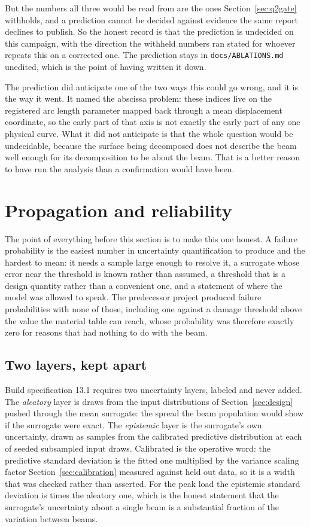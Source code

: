 \documentclass[11pt,a4paper]{article}
\begin{document}
But the numbers all three would be read from are the ones Section~\ref{sec:q2gate} withholds,
and a prediction cannot be decided against evidence the same report declines to publish. So the
honest record is that the prediction is undecided on this campaign, with the direction the
withheld numbers ran stated for whoever repeats this on a corrected one. The prediction stays in
\texttt{docs/ABLATIONS.md} unedited, which is the point of having written it down.

The prediction did anticipate one of the two ways this could go wrong, and it is the way it
went. It named the abscissa problem: these indices live on the registered arc length parameter
mapped back through a mean displacement coordinate, so the early part of that axis is not
exactly the early part of any one physical curve. What it did not anticipate is that the whole
question would be undecidable, because the surface being decomposed does not describe the beam
well enough for its decomposition to be about the beam. That is a better reason to have run the
analysis than a confirmation would have been.

\section{Propagation and reliability}
\label{sec:propagation}
The point of everything before this section is to make this one honest. A failure probability is
the easiest number in uncertainty quantification to produce and the hardest to mean: it needs a
sample large enough to resolve it, a surrogate whose error near the threshold is known rather
than assumed, a threshold that is a design quantity rather than a convenient one, and a
statement of where the model was allowed to speak. The predecessor project produced failure
probabilities with none of those, including one against a damage threshold above the value the
material table can reach, whose probability was therefore exactly zero for reasons that had
nothing to do with the beam.

\subsection{Two layers, kept apart}
\label{sec:layers}
Build specification 13.1 requires two uncertainty layers, labeled and never added. The
\emph{aleatory} layer is \MCSamples{} draws from the input distributions of
Section~\ref{sec:design} pushed through the mean surrogate: the spread the beam population
would show if the surrogate were exact. The \emph{epistemic} layer is the surrogate's own
uncertainty, drawn as \MCPosteriorDraws{} samples from the calibrated predictive distribution
at each of \MCEpistemicSubsample{} seeded subsampled input draws. Calibrated is the operative
word: the predictive standard deviation is the fitted one multiplied by the variance scaling
factor Section~\ref{sec:calibration} measured against held out data, so it is a width that was
checked rather than asserted. For the peak load the epistemic standard deviation is
\PropPeakEpistemicShare{} times the aleatory one, which is the honest statement that the
surrogate's uncertainty about a single beam is a substantial fraction of the variation between
beams.
\end{document}

